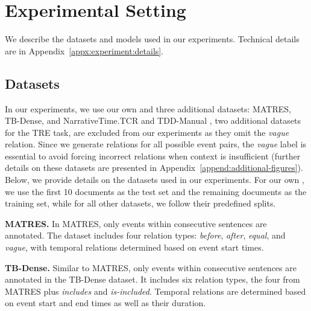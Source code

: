 \section{Experimental Setting}
\label{section:experiment}

We describe the datasets and models used in our experiments. Technical details are in Appendix~\ref{appx:experiment:details}.




\subsection{Datasets}
\label{section:experiment:datasets}


In our experiments, we use our own \App{} and three additional datasets: MATRES, TB-Dense, and NarrativeTime.TCR \cite{ning-etal-2018-joint} and TDD-Manual \cite{naik-etal-2019-tddiscourse}, two additional datasets for the TRE task, are excluded from our experiments as they omit the \textit{vague} relation. Since we generate relations for all possible event pairs, the \textit{vague} label is essential to avoid forcing incorrect relations when context is insufficient (further details on these datasets are presented in Appendix~\ref{append:additional-figures}). 
Below, we provide details on the datasets used in our experiments. 
For our own \App{}, we use the first 10 documents as the test set and the remaining documents as the training set, while for all other datasets, we follow their predefined splits.


\textbf{MATRES.} In MATRES, only events within consecutive sentences are annotated. The dataset includes four relation types: \textit{before}, \textit{after}, \textit{equal}, and \textit{vague}, with temporal relations determined based on event start times. 

\textbf{TB-Dense.} Similar to MATRES, only events within consecutive sentences are annotated in the TB-Dense dataset. It includes six relation types, the four from MATRES plus \textit{includes} and \textit{is-included}. Temporal relations are determined based on event start and end times as well as their duration. 


